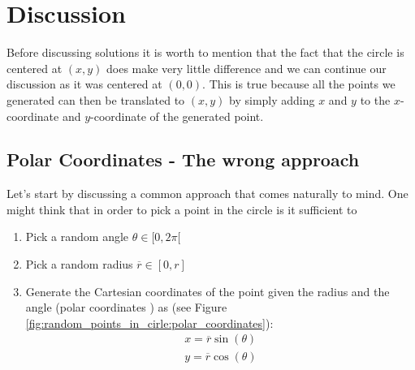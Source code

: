 \section{Discussion}
\label{random_points_in_circle:sec:discussion}
Before discussing solutions it is worth to mention that the fact that the circle is centered at $(x,y)$ does make very little difference and we can continue our discussion as it was centered at $(0,0)$. This is true because all the points we generated can then be translated to $(x,y)$ by simply adding $x$ and $y$ to the $x$-coordinate and $y$-coordinate of the generated point.

\subsection{Polar Coordinates - The wrong approach}
\label{random_points_in_circle:sec:buggy}
Let's start by discussing a common approach that comes naturally to mind. One might think that in order to pick a point in the circle is it sufficient to 
\begin{enumerate}
	\item Pick a random angle $\theta \in [0, 2\pi[ $
	\item Pick a random radius $\overline{r} \in [0,r]$
	\item Generate the Cartesian coordinates of the point given the radius and the angle (polar coordinates \cite{cit:wiki:polar_coordinates}) as (see Figure \ref{fig:random_points_in_cirle:polar_coordinates}):
	\begin{gather*}
		 x=\overline{r}\sin(\theta) \\
		 y=\overline{r}\cos(\theta) 
	\end{gather*}
\end{enumerate}


